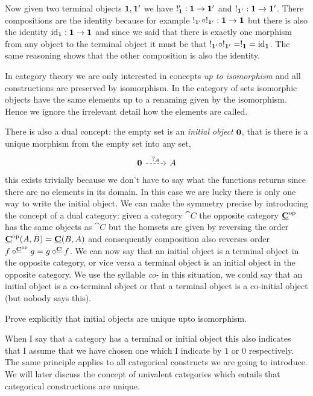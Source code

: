 Now given two terminal objects $\bf{1},\bf{1'}$ we have $!'_{\bf{1}} : \bf{1} \to \bf{1'}$ and $!_{\bf{1'}} : \bf{1} \to \bf{1'}$. There compositions are the identity because for example $!_{\bf{1'}} \circ !_{\bf{1'}} : \bf{1} \to \bf{1}$ but there is also the identity $\mathrm{id}_{\bf{1}} : \bf{1} \to \bf{1}$ and since we said that there is exactly one morphism from any object to the terminal object it must be that $!_{\bf{1'}} \circ !_{\bf{1'}} = !_{\bf{1}} = \mathrm{id}_{\bf{1}}$. The same reasoning shows that the other composition is also the identity.

In category theory we are only interested in concepts \emph{up to isomorphism} and all constructions are preserved by isomorphism. In the category of sets isomorphic objects have the same elements up to a renaming given by the isomorphism. Hence we ignore the irrelevant detail how the elements are called.

There is also a dual concept: the empty set is an \emph{initial object} $\bf{0}$, that is there is a unique morphism from the empty set into any set, 
\[\begin{tikzcd}
  \bf{0} \arrow[r, dashrightarrow, "?_A"] & A
\end{tikzcd}\]
this exists trivially because we don't have to say what the functions returns since there are no elements in its domain. In this case we are lucky there is only one way to write the initial object. We can make the symmetry precise by introducing the concept of a dual category: given a category $\cat{C}$ the opposite category $\underline{\mathbf{C}}^{\mathrm{op}}$ has the same objects as $\cat{C}$ but the homsets are given by reversing the order $\underline{\mathbf{C}}^{\mathrm{op}}(A,B) = \underline{\mathbf{C}}(B,A)$ and consequently composition also reverses order $f \circ^{\underline{\mathbf{C}}^{\mathrm{op}}} g = g \circ^{\underline{\mathbf{C}}} f$. We can now say that an initial object is a terminal object in the opposite category, or vice versa a terminal object is an initial object in the opposite 
category. We use the syllable \emph{co-} in this situation, we could say that an initial object is a co-terminal object or that a terminal object is a co-initial object (but nobody says this).

\begin{Exercise}
  Prove explicitly that initial objects are unique upto isomorphism.
\end{Exercise}

When I say that a category has a terminal or initial object this also indicates that I assume that we have chosen one which I indicate by $1$ or $0$ respectively. The same principle applies to all categorical constructs we are going to introduce. We will later discuss the concept of univalent categories which entails that categorical constructions are unique.

